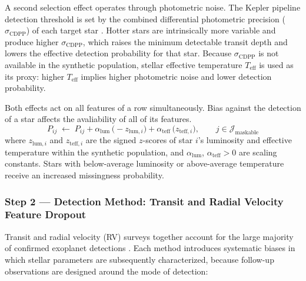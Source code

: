 \documentclass[preprint,longauthor,twocolumn]{aastex631}
\begin{document}
A second selection effect operates through photometric noise. The Kepler pipeline detection threshold is set by the combined differential photometric precision ($\sigma_{\mathrm{CDPP}}$) of each target star \citep{howardPLANETOCCURRENCE0252012}. Hotter stars are intrinsically more variable and produce higher $\sigma_{\mathrm{CDPP}}$, which raises the minimum detectable transit depth and lowers the effective detection probability for that star. Because $\sigma_{\mathrm{CDPP}}$ is not available in the synthetic population, stellar effective temperature $T_{\mathrm{eff}}$ is used as its proxy: higher $T_{\mathrm{eff}}$ implies higher photometric noise and lower detection probability.

Both effects act on all features of a row simultaneously. Bias against the detection of a star affects the avaliability of all of its features.
\begin{equation}
  P_{ij} \;\leftarrow\; P_{ij}
    + \alpha_{\mathrm{lum}}\,\bigl(-z_{\mathrm{lum},i}\bigr)
    + \alpha_{\mathrm{teff}}\,\bigl(z_{\mathrm{teff},i}\bigr),
  \qquad j \in \mathcal{J}_{\mathrm{maskable}}
  \label{eq:rshm-step1}
\end{equation}
where $z_{\mathrm{lum},i}$ and $z_{\mathrm{teff},i}$ are the signed $z$-scores of star $i$'s luminosity and effective temperature within the synthetic population, and $\alpha_{\mathrm{lum}}$, $\alpha_{\mathrm{teff}} > 0$ are scaling constants. Stars with below-average luminosity or above-average temperature receive an increased missingness probability.

\subsubsection*{Step 2 --- Detection Method: Transit and Radial Velocity Feature Dropout}

Transit and radial velocity (RV) surveys together account for the large majority of confirmed exoplanet detections \citep{mirchandaniDetectionBiasesMethodological2025}. Each method introduces systematic biases in which stellar parameters are subsequently characterized, because follow-up observations are designed around the mode of detection:
\end{document}
